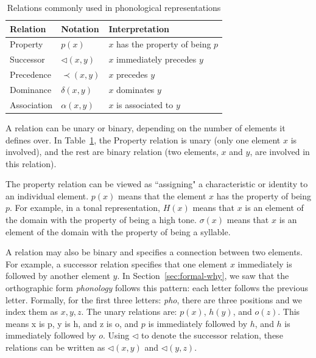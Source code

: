 \begin{table}[!ht]
    \centering
    \begin{tabular}{lll}
        \toprule
        \textbf{Relation} & \textbf{Notation} & \textbf{Interpretation} \\
        \midrule
        Property   & $p(x)$            & $x$ has the property of being $p$ \\
        Successor   & $\lhd(x,y)$            & $x$ immediately precedes $y$\\
        Precedence  & $\prec(x,y)$                & $x$ precedes $y$ \\
        Dominance   & $\delta(x,y)$ & $x$ dominates $y$ \\
        Association & $\alpha(x,y)$          & $x$ is associated to $y$ \\
        \bottomrule
    \end{tabular}
    \caption{Relations commonly used in phonological representations}
    \label{tab:relations}
\end{table}


A relation can be unary or binary, depending on the number of elements it defines over. In Table~\ref{tab:relations}, the Property relation
is unary (only one element $x$ is involved), and the rest are binary 
relation (two elements, $x$ and $y$, are involved in this relation). 

The property relation can be viewed as ``assigning" a characteristic or identity to an individual element. \(p(x)\) means that the element \(x\) has the property of being \(p\). For example, in a tonal representation, \(H(x)\) means that \(x\) is an element of the domain with the property of being a high tone. \(\sigma(x)\) means that \(x\) is an element of the domain with the property of being a syllable.

A relation may also be binary and specifies a connection between two elements. For example, a successor relation specifies that one element \(x\) immediately is followed by another element \(y\). In Section~\ref{sec:formal-why}, we saw that the orthographic form \textit{phonology} follows this pattern: each letter
follows the previous letter. Formally, for the first three letters: \textit{pho}, there are three positions and we index them as \(x, y, z\). The unary relations are: \(p(x)\), \(h(y)\), and \(o(z)\). This means x is p, y is h, and z is o, and \(p\) is immediately followed by \(h\), and \(h\) is immediately followed by \(o\). Using \(\lhd\) to denote the successor relation, these relations can be written as \(\lhd(x,y)\) and \(\lhd(y,z)\).

